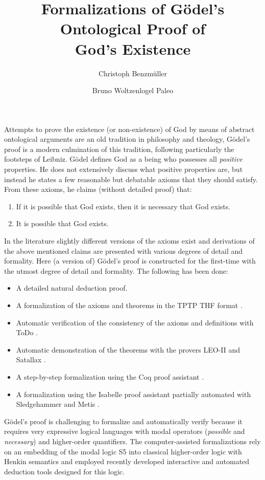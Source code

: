 \documentclass{llncs}
\title{
  Formalizations of G\"{o}del's Ontological Proof of \\
  God's Existence
}
\author{
  Christoph Benzm\"{u}ller\inst{1} 
  \and 
  Bruno Woltzenlogel Paleo\inst{2}
}
\institute{
  Theory and Logic Group, Vienna University of Technology, Austria \\
  \email{bruno@logic.at}
  \and
  Dahlem Center for Intelligent Systems, Freie Universit\"{a}t Berlin, Germany\\
  \email{c.benzmueller@gmail.com}
}
\begin{document}
\maketitle

Attempts to prove the existence (or non-existence) of God by means of 
abstract ontological arguments are an old tradition in philosophy and theology,
G\"{o}del's proof is a modern culmination of this tradition, following particularly 
the footsteps of Leibniz.
%
G\"{o}del defines God as a being who possesses all \emph{positive} properties.
He does not extensively discuss what positive properties are, 
but instead he states a few reasonable but debatable axioms that they should satisfy.
From these axioms, he claims (without detailed proof) that:
\begin{enumerate}
\item If it is possible that God exists, then it is necessary that God exists.
\item It is possible that God exists.
\end{enumerate}

In the literature \cite{ToDo} slightly different versions of the axioms exist 
and derivations of the above mentioned claims are presented with various degrees
of detail and formality. Here \cite{ToDo: GitHub Repository} (a version of) G\"{o}del's proof is 
constructed for the first-time
with the utmost degree of detail and formality. The following has been done:
\begin{itemize}
\item A detailed natural deduction proof.
%
\item A formalization of the axioms and theorems in the TPTP THF format \cite{ToDo}.
%
\item Automatic verification of the consistency of the axioms and 
definitions with ToDo \cite{ToDo}.
%
\item Automatic demonstration of the theorems with the provers LEO-II \cite{ToDo} and Satallax \cite{ToDo}.

\item A step-by-step formalization using the Coq proof assistant \cite{ToDo}.

\item A formalization using the Isabelle proof assistant \cite{ToDo} partially automated with Sledgehammer \cite{ToDo} and Metis \cite{ToDo}.
\end{itemize}

G\"{o}del's proof is challenging to formalize and automatically verify 
because it requires very expressive logical languages with 
modal operators (\emph{possible} and \emph{necessary}) and higher-order quantifiers. 
The computer-assisted formalizations rely on an embedding of the modal logic S5 
into classical higher-order logic with Henkin 
semantics \cite{ToDo: Current works of Christoph Benzmüller and Larry Paulson} and 
employed recently developed interactive and automated deduction tools designed for this logic.
\end{document}
